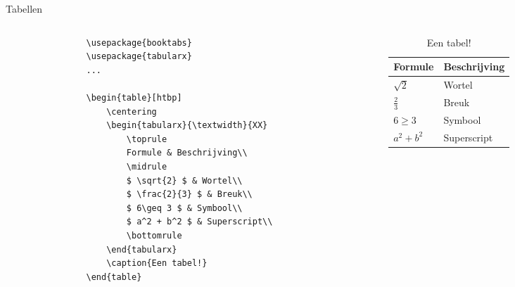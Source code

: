 \begin{frame}[fragile]{Tabellen}
    \begin{columns}
        \begin{column}{0.5\textwidth}
            \begin{verbatim}
                \usepackage{booktabs}
                \usepackage{tabularx}
                ...

                \begin{table}[htbp]
                    \centering
                    \begin{tabularx}{\textwidth}{XX}
                        \toprule
                        Formule & Beschrijving\\
                        \midrule
                        $ \sqrt{2} $ & Wortel\\
                        $ \frac{2}{3} $ & Breuk\\
                        $ 6\geq 3 $ & Symbool\\
                        $ a^2 + b^2 $ & Superscript\\
                        \bottomrule
                    \end{tabularx}
                    \caption{Een tabel!}
                \end{table}
            \end{verbatim}
        \end{column}
        \begin{column}{0.5\textwidth}
            \begin{adjustbox}{frame=1pt 10pt}%
                \begin{minipage}{\textwidth-22pt}
                    \begin{table}[H]
                        \centering
                        \begin{tabularx}{\textwidth}{XX}
                            \toprule
                            Formule & Beschrijving\\
                            \midrule
                            $ \sqrt{2} $ & Wortel\\
                            $ \frac{2}{3} $ & Breuk\\
                            $ 6\geq 3 $ & Symbool\\
                            $ a^2 + b^2 $ & Superscript\\
                            \bottomrule
                        \end{tabularx}
                        \caption{Een tabel!}
                    \end{table}
                    \vspace{-20pt}
                \end{minipage}
            \end{adjustbox}
        \end{column}
    \end{columns}
\end{frame}


